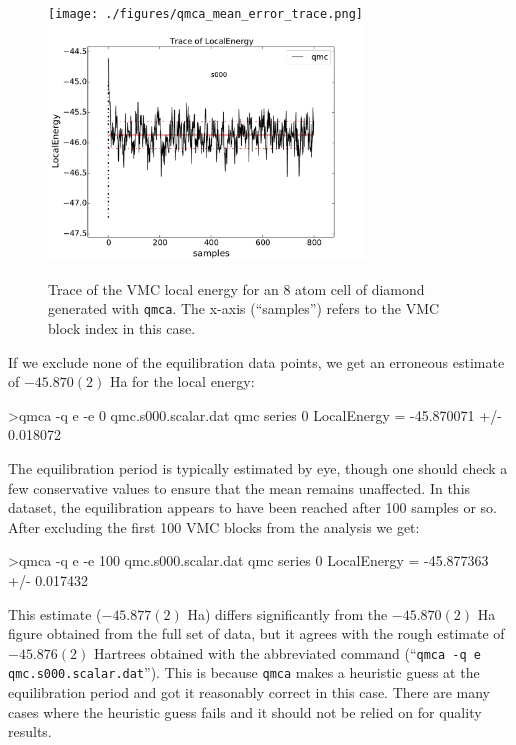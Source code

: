 \begin{figure}
\begin{center}
\ifdefined\HCode
\texttt{[image: ./figures/qmca\_mean\_error\_trace.png]}
\else
\includegraphics[trim = 0mm 0mm 0mm 0mm,clip,width=0.75\textwidth]{./figures/qmca_mean_error_trace.pdf}
\fi
\caption{Trace of the VMC local energy for an 8 atom cell of diamond generated with \texttt{qmca}.  The x-axis (``samples'') refers to the VMC block index in this case.}
\label{fig:qmca_mean_error_trace}
\end{center}
\end{figure}

If we exclude none of the equilibration data points, we get an 
erroneous estimate of $-45.870(2)$ Ha for the local energy:
\begin{shade}
>qmca -q e -e 0 qmc.s000.scalar.dat 
qmc  series 0  LocalEnergy           =  -45.870071 +/- 0.018072
\end{shade}
\noindent
The equilibration period is typically estimated by eye, though one should
check a few conservative values to ensure that the mean remains 
unaffected.  In this dataset, the equilibration appears to have been 
reached after 100 samples or so.  After excluding the first 100 
VMC blocks from the analysis we get:
\begin{shade}
>qmca -q e -e 100 qmc.s000.scalar.dat 
qmc  series 0  LocalEnergy           =  -45.877363 +/- 0.017432
\end{shade}
\noindent
This estimate ($-45.877(2)$ Ha) differs significantly from the 
$-45.870(2)$ Ha figure obtained from the full set of data, but it 
agrees with the rough estimate of $-45.876(2)$ Hartrees obtained 
with the abbreviated command (``\texttt{qmca -q e qmc.s000.scalar.dat}'').
This is because \texttt{qmca} makes a heuristic guess at the 
equilibration period and got it reasonably correct in this case. 
There are many cases where the heuristic guess fails and it should not 
be relied on for quality results.

